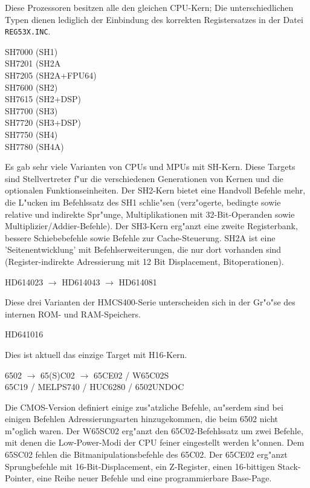 \documentclass[12pt,a4paper,twoside]{report}
\newcommand{\tty}[1]{{\tt #1}}
\begin{document}
Diese Prozessoren besitzen alle den gleichen CPU-Kern; Die unterschiedlichen
Typen dienen lediglich der Einbindung des korrekten Registersatzes
in der Datei \tty{REG53X.INC}.
\begin{cpulist}
   SH7000 (SH1) \\
   SH7201 (SH2A \\
   SH7205 (SH2A+FPU64) \\
   SH7600 (SH2) \\
   SH7615 (SH2+DSP) \\
   SH7700 (SH3) \\
   SH7720 (SH3+DSP) \\
   SH7750 (SH4) \\
   SH7780 (SH4A) \\
\end{cpulist}
Es gab sehr viele Varianten von CPUs und MPUs mit SH-Kern.  Diese Targets
sind Stellvertreter f"ur die verschiedenen Generationen von Kernen
und die optionalen Funktionseinheiten.  Der SH2-Kern bietet eine
Handvoll Befehle mehr, die L"ucken im Befehlssatz des SH1 schlie"sen
(verz"ogerte, bedingte sowie relative und indirekte Spr"unge,
Multiplikationen mit 32-Bit-Operanden sowie Multiplizier/Addier-Befehle).
Der SH3-Kern erg"anzt eine zweite Registerbank, bessere Schiebebefehle
sowie Befehle zur Cache-Steuerung.  SH2A ist eine 'Seitenentwicklung'
mit Befehlserweiterungen, die nur dort vorhanden sind (Register-indirekte
Adressierung mit 12 Bit Displacement, Bitoperationen).
\begin{cpulist}
   HD614023 $\longrightarrow$ HD614043 $\longrightarrow$ HD614081
\end{cpulist}
Diese drei Varianten der HMCS400-Serie unterscheiden sich in der
Gr"o"se des internen ROM- und RAM-Speichers.
\begin{cpulist}
   HD641016
\end{cpulist}
Dies ist aktuell das einzige Target mit H16-Kern.
\begin{cpulist}
   6502 $\rightarrow$ 65(S)C02 $\rightarrow$ 65CE02 / W65C02S\\
\> 65C19 / MELPS740 / HUC6280 / 6502UNDOC
\end{cpulist}
Die CMOS-Version definiert einige zus"atzliche Befehle, au"serdem sind
bei einigen Befehlen Adressierungsarten hinzugekommen, die beim 6502
nicht m"oglich waren.  Der W65SC02 erg"anzt den
65C02-Befehlssatz um zwei Befehle, mit denen die Low-Power-Modi
der CPU feiner eingestellt werden k"onnen.  Dem 65SC02 fehlen die
Bitmanipulationsbefehle des 65C02.  Der 65CE02 erg"anzt Sprungbefehle
mit 16-Bit-Displacement, ein Z-Register, einen 16-bittigen Stack-Pointer,
eine Reihe neuer Befehle und eine programmierbare Base-Page.
\end{document}
